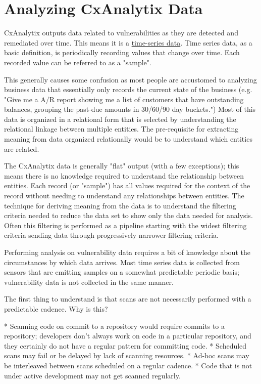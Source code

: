 \chapter{Analyzing CxAnalytix Data}

CxAnalytix outputs data related to vulnerabilities as they are detected and remediated over time.  This means it is a 
\href{https://en.wikipedia.org/wiki/Time_series}{time-series data}.  Time series data, as a basic definition, is periodically recording values that change over time.  
Each recorded value can be referred to as a "sample".

This generally causes some confusion as most people are accustomed to analyzing business data that essentially only records the current state of the business (e.g. "Give me a A/R report showing me a list of customers that have outstanding balances, grouping the past-due amounts in 30/60/90 day buckets.")  Most of this data is organized in a relational form that is selected by understanding the relational linkage between multiple entities.  The pre-requisite for extracting meaning from data organized relationally would be to understand which entities are related.

The CxAnalytix data is generally "flat" output (with a few exceptions); this means there is no knowledge required to understand the relationship between entities.  Each record (or "sample") has all values required for the context of the record without needing to understand any relationships between entities.  The technique for deriving meaning from the data is to understand the filtering criteria needed to reduce the data set to show only the data needed for analysis.  Often this filtering is performed as a pipeline starting with the widest filtering criteria sending data through progressively narrower filtering criteria.


Performing analysis on vulnerability data requires a bit of knowledge about the circumstances by which data arrives.  Most time series data is collected from sensors that are emitting samples on a somewhat predictable periodic basis; vulnerability data is not collected in the same manner.


The first thing to understand is that scans are not necessarily performed with a predictable cadence.  Why is this?

* Scanning code on commit to a repository would require commits to a repository; developers don't always work on code in a particular repository, and they certainly do not have a regular pattern for committing code.
* Scheduled scans may fail or be delayed by lack of scanning resources.
* Ad-hoc scans may be interleaved between scans scheduled on a regular cadence.
* Code that is not under active development may not get scanned regularly.


